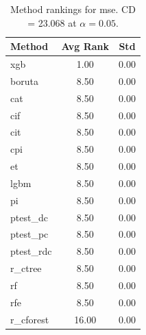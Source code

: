 \begin{table}[h]
\centering
\caption{Method rankings for mse. CD = 23.068 at $\alpha=0.05$.}
\label{tab:ranks_mse}
\begin{tabular}{lcc}
\toprule
Method & Avg Rank & Std \\
\midrule
xgb & 1.00 & 0.00 \\
boruta & 8.50 & 0.00 \\
cat & 8.50 & 0.00 \\
cif & 8.50 & 0.00 \\
cit & 8.50 & 0.00 \\
cpi & 8.50 & 0.00 \\
et & 8.50 & 0.00 \\
lgbm & 8.50 & 0.00 \\
pi & 8.50 & 0.00 \\
ptest_dc & 8.50 & 0.00 \\
ptest_pc & 8.50 & 0.00 \\
ptest_rdc & 8.50 & 0.00 \\
r_ctree & 8.50 & 0.00 \\
rf & 8.50 & 0.00 \\
rfe & 8.50 & 0.00 \\
r_cforest & 16.00 & 0.00 \\
\bottomrule
\end{tabular}
\end{table}